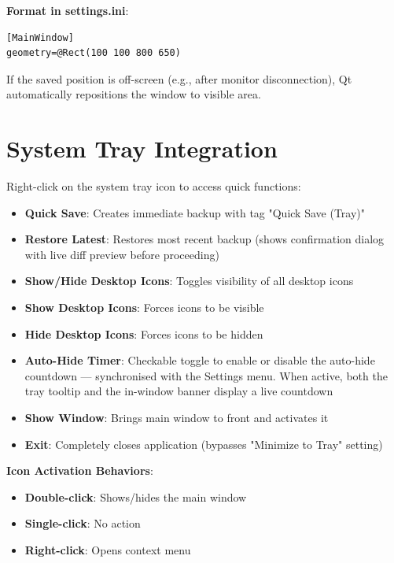 \documentclass[a4paper,11pt]{article}
\begin{document}
\textbf{Format in settings.ini}:
\begin{verbatim}
[MainWindow]
geometry=@Rect(100 100 800 650)
\end{verbatim}

\begin{infobox}[Note]
  If the saved position is off-screen (e.g., after monitor disconnection),
  Qt automatically repositions the window to visible area.
\end{infobox}

\section{System Tray Integration}

Right-click on the system tray icon to access quick functions:

\begin{itemize}
  \item \textbf{Quick Save}: Creates immediate backup with tag "Quick
    Save (Tray)"
  \item \textbf{Restore Latest}: Restores most recent backup (shows
    confirmation dialog with live diff preview before proceeding)
  \item \textbf{Show/Hide Desktop Icons}: Toggles visibility of all
    desktop icons
  \item \textbf{Show Desktop Icons}: Forces icons to be visible
  \item \textbf{Hide Desktop Icons}: Forces icons to be hidden
  \item \textbf{Auto-Hide Timer}: Checkable toggle to enable or disable
    the auto-hide countdown --- synchronised with the Settings menu.
    When active, both the tray tooltip and the in-window banner
    display a live countdown
  \item \textbf{Show Window}: Brings main window to front and activates it
  \item \textbf{Exit}: Completely closes application (bypasses
    "Minimize to Tray" setting)
\end{itemize}

\textbf{Icon Activation Behaviors}:
\begin{itemize}
  \item \textbf{Double-click}: Shows/hides the main window
  \item \textbf{Single-click}: No action
  \item \textbf{Right-click}: Opens context menu
\end{itemize}
\end{document}
